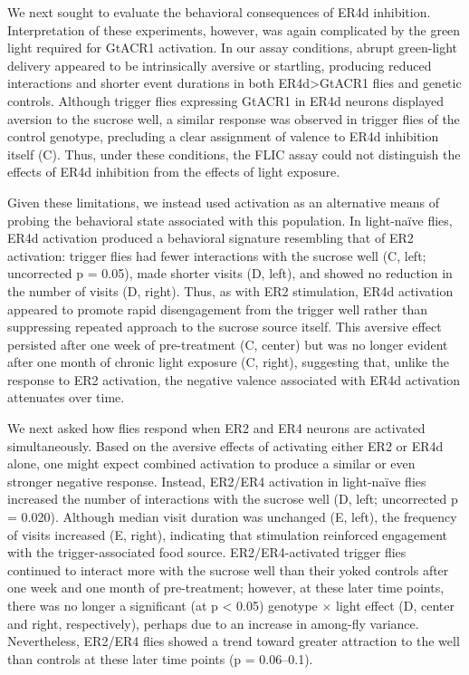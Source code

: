 We next sought to evaluate the behavioral consequences of ER4d inhibition. 
Interpretation of these experiments, however, was again complicated by the green light required for GtACR1 activation. 
In our assay conditions, abrupt green-light delivery appeared to be intrinsically aversive or startling, producing reduced interactions and shorter event durations in both ER4d>GtACR1 flies and genetic controls. 
Although trigger flies expressing GtACR1 in ER4d neurons displayed aversion to the sucrose well, a similar response was observed in trigger flies of the control genotype, precluding a clear assignment of valence to ER4d inhibition itself (C). 
Thus, under these conditions, the FLIC assay could not distinguish the effects of ER4d inhibition from the effects of light exposure.

Given these limitations, we instead used activation as an alternative means of probing the behavioral state associated with this population. 
In light-naïve flies, ER4d activation produced a behavioral signature resembling that of ER2 activation: trigger flies had fewer interactions with the sucrose well (C, left; uncorrected p = 0.05), made shorter visits (D, left), and showed no reduction in the number of visits (D, right). 
Thus, as with ER2 stimulation, ER4d activation appeared to promote rapid disengagement from the trigger well rather than suppressing repeated approach to the sucrose source itself. 
This aversive effect persisted after one week of pre-treatment (C, center) but was no longer evident after one month of chronic light exposure (C, right), suggesting that, unlike the response to ER2 activation, the negative valence associated with ER4d activation attenuates over time.

We next asked how flies respond when ER2 and ER4 neurons are activated simultaneously. 
Based on the aversive effects of activating either ER2 or ER4d alone, one might expect combined activation to produce a similar or even stronger negative response. 
Instead, ER2/ER4 activation in light-naïve flies increased the number of interactions with the sucrose well (D, left; uncorrected p = 0.020). Although median visit duration was unchanged (E, left), the frequency of visits increased (E, right), indicating that stimulation reinforced engagement with the trigger-associated food source. 
ER2/ER4-activated trigger flies continued to interact more with the sucrose well than their yoked controls after one week and one month of pre-treatment; however, at these later time points, there was no longer a significant (at p < 0.05) genotype $\times$ light effect (D, center and right, respectively), perhaps due to an increase in among-fly variance.
Nevertheless, ER2/ER4 flies showed a trend toward greater attraction to the well than controls at these later time points (p = 0.06–0.1).
 
